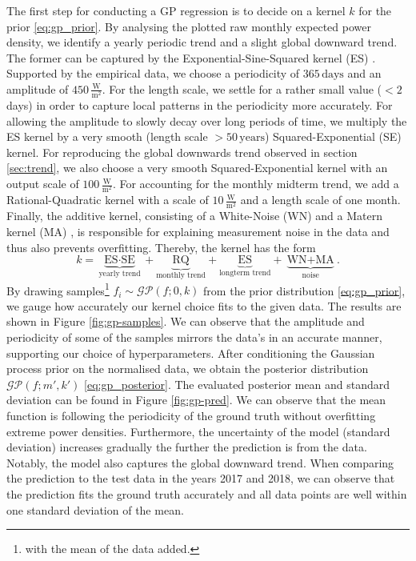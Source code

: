 \documentclass{article}
\theoremstyle{plain}
\theoremstyle{definition}
\theoremstyle{remark}
\begin{document}
The first step for conducting a GP regression is to decide on a kernel $k$ for the prior \eqref{eq:gp_prior}. By analysing the plotted raw monthly expected power density, we identify a yearly periodic trend and a slight global downward trend. The former can be captured by the Exponential-Sine-Squared kernel (ES) \cite{MacKay1998IntroductionTG}. Supported by the empirical data, we choose a periodicity of $365 \, \text{days}$ and an amplitude of $450 \, \frac{\textrm{W}}{\text{m}^2}$. For the length scale, we settle for a rather small value ($< 2 \, $ days) in order to capture local patterns in the periodicity more accurately. For allowing the amplitude to slowly decay over long periods of time, we multiply the ES kernel by a very smooth (length scale $> 50 \, \text{years}$) Squared-Exponential (SE) kernel. For reproducing the global downwards trend observed in section \ref{sec:trend}, we also choose a very smooth Squared-Exponential kernel with an output scale of $100 \, \frac{\textrm{W}}{\text{m}^2}$. For accounting for the monthly midterm trend, we add a Rational-Quadratic kernel \cite{rasmussen-williams-gp} with a scale of $10 \, \frac{\textrm{W}}{\text{m}^2}$ and a length scale of one month. Finally, the additive kernel, consisting of a White-Noise (WN) and a Matern kernel (MA) \cite{abramowitz1968handbook}, is responsible for explaining measurement noise in the data and thus also prevents overfitting. Thereby, the kernel has the form
$$k = \underbrace{\text{ES} \cdot \text{SE}}_{\text{yearly trend}} + \underbrace{\text{RQ}}_\text{monthly trend} + \underbrace{\text{ES}}_\text{longterm trend} + \underbrace{\text{WN} + \text{MA}}_{\text{noise}}.$$
By drawing samples\footnote{with the mean of the data added.} $f_i \sim \mathcal{GP}(f; 0, k)$ from the prior distribution \eqref{eq:gp_prior}, we gauge how accurately our kernel choice fits to the given data. The results are shown in Figure \ref{fig:gp-samples}. We can observe that the amplitude and periodicity of some of the samples mirrors the data's in an accurate manner, supporting our choice of hyperparameters. After conditioning the Gaussian process prior on the normalised data, we obtain the posterior distribution $\mathcal{GP}(f; m', k')$ \eqref{eq:gp_posterior}. The evaluated posterior mean and standard deviation can be found in Figure \ref{fig:gp-pred}. We can observe that the mean function is following the periodicity of the ground truth without overfitting extreme power densities. Furthermore, the uncertainty of the model (standard deviation) increases gradually the further the prediction is from the data. Notably, the model also captures the global downward trend. When comparing the prediction to the test data in the years 2017 and 2018, we can observe that the prediction fits the ground truth accurately and all data points are well within one standard deviation of the mean.
\end{document}
